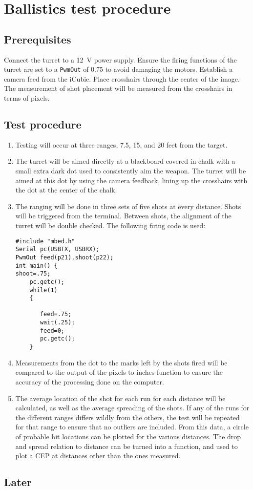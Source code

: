 ﻿\section{Ballistics test procedure}
\label{app:A}

\subsection{Prerequisites}
Connect the turret to a \SI{12}{\volt} power supply. Ensure the firing functions of the turret are set to a \lstinline{PwmOut} of 0.75 to avoid damaging the motors. Establish a camera feed from the iCubie. Place crosshairs through the center of the image. The measurement of shot placement will be measured from the crosshairs in terms of pixels.

\subsection{Test procedure}
\begin{enumerate}
\item Testing will occur at three ranges, 7.5, 15, and 20 feet from the target. 

\item The turret will be aimed directly at a blackboard covered in chalk with a small extra dark dot used to consistently aim the weapon. The turret will be aimed at this dot by using the camera feedback, lining up the crosshairs with the dot at the center of the chalk.

\item The ranging will be done in three sets of five shots at every distance. Shots will be triggered from the terminal. Between shots, the alignment of the turret will be double checked. The following firing code is used:
\begin{lstlisting}
#include "mbed.h"
Serial pc(USBTX, USBRX);
PwmOut feed(p21),shoot(p22);
int main() {
shoot=.75;
    pc.getc();
    while(1) 
    {
       
       feed=.75;
       wait(.25);
       feed=0;
       pc.getc();
    }
\end{lstlisting}

\item Measurements from the dot to the marks left by the shots fired will be compared to the output of the pixels to inches function to ensure the accuracy of the processing done on the computer. 

\item The average location of the shot for each run for each distance will be calculated, as well as the average spreading of the shots. If any of the runs for the different ranges differs wildly from the others, the test will be repeated for that range to ensure that no outliers are included. From this data, a circle of probable hit locations can be plotted for the various distances. The drop and spread relation to distance can be turned into a function, and used to plot a CEP at distances other than the ones measured.
\end{enumerate}

\subsection{Later}





  